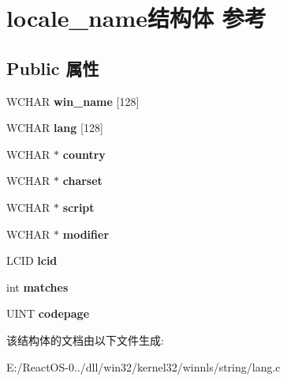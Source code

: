\hypertarget{structlocale__name}{}\section{locale\+\_\+name结构体 参考}
\label{structlocale__name}
\subsection*{Public 属性}
\begin{DoxyCompactItemize}
\item 
\mbox{\label{structlocale__name_a05f9ad189d71141321e15b013ce4a290}} 
W\+C\+H\+AR {\bfseries win\+\_\+name} \mbox{[}128\mbox{]}
\item 
\mbox{\label{structlocale__name_a2895bb15d49e2716c59c0c0b1ea5f755}} 
W\+C\+H\+AR {\bfseries lang} \mbox{[}128\mbox{]}
\item 
\mbox{\label{structlocale__name_a2b57c0128ebda0c7584b37b48f9fc32e}} 
W\+C\+H\+AR $\ast$ {\bfseries country}
\item 
\mbox{\label{structlocale__name_a2dfe9ec68cbc1a70ae59660fa5eea6f9}} 
W\+C\+H\+AR $\ast$ {\bfseries charset}
\item 
\mbox{\label{structlocale__name_a9cfdcb5e7d93c18ba5bb314f31880686}} 
W\+C\+H\+AR $\ast$ {\bfseries script}
\item 
\mbox{\label{structlocale__name_a890489d931f6bdd1dc0a4f148d484473}} 
W\+C\+H\+AR $\ast$ {\bfseries modifier}
\item 
\mbox{\label{structlocale__name_a26c78f13da688c9c2936143453bb783c}} 
L\+C\+ID {\bfseries lcid}
\item 
\mbox{\label{structlocale__name_a1809d551faef980ba467dfeb85a873dd}} 
int {\bfseries matches}
\item 
\mbox{\label{structlocale__name_a2070e3c49361469b3da2c4c7f53eae89}} 
U\+I\+NT {\bfseries codepage}
\end{DoxyCompactItemize}


该结构体的文档由以下文件生成\+:\begin{DoxyCompactItemize}
\item 
E\+:/\+React\+O\+S-\/0../dll/win32/kernel32/winnls/string/lang.\+c\end{DoxyCompactItemize}
